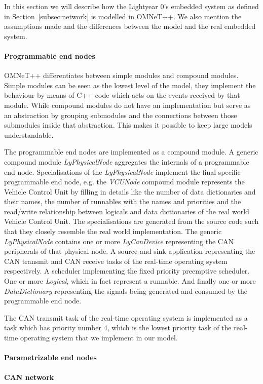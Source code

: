 In this section we will describe how the Lightyear 0's embedded system as defined in Section~\ref{subsec:network} is modelled in OMNeT++. We also mention the assumptions made and the differences between the model and the real embedded system.

\paragraph{Programmable end nodes} OMNeT++ differentiates between simple modules and compound modules. Simple modules can be seen as the lowest level of the model, they implement the behaviour by means of C++ code which acts on the events received by that module. While compound modules do not have an implementation but serve as an abstraction by grouping submodules and the connections between those submodules inside that abstraction. This makes it possible to keep large models understandable.

The programmable end nodes are implemented as a compound module. A generic compound module \textit{LyPhysicalNode} aggregates the internals of a programmable end node. Specialisations of the \textit{LyPhysicalNode} implement the final specific programmable end node, e.g. the \textit{VCUNode} compound module represents the Vehicle Control Unit by filling in details like the number of data dictionaries and their names, the number of runnables with the names and priorities and the read/write relationship between logicals and data dictionaries of the real world Vehicle Control Unit. The specialisations are generated from the source code such that they closely resemble the real world implementation. The generic \textit{LyPhysicalNode} contains one or more \textit{LyCanDevice} representing the CAN peripherals of that physical node. A source and sink application representing the CAN transmit and CAN receive tasks of the real-time operating system respectively. A scheduler implementing the fixed priority preemptive scheduler. One or more \textit{Logical}, which in fact represent a runnable. And finally one or more \textit{DataDictionary} representing the signals being generated and consumed by the programmable end node.


The CAN transmit task of the real-time operating system is implemented as a task which has priority number 4, which is the lowest priority task of the real-time operating system that we implement in our model.

\paragraph{Parametrizable end nodes}

\paragraph{CAN network}